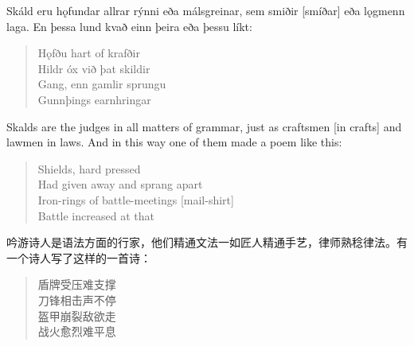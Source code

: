 \begin{paracol}{2}
    Skáld eru hǫfundar allrar rýnni eða málsgreinar, sem smiðir [smíðar] eða lǫgmenn laga. En þessa lund kvað einn þeira eða þessu líkt:
    \begin{quote}
        Hǫfðu hart of krafðir\\
        Hildr óx við þat skildir\\
        Gang, enn gamlir sprungu\\
        Gunnþings earnhringar\footnotemark[1]
    \end{quote}

    \switchcolumn
    Skalds are the judges in all matters of grammar, just as craftsmen [in crafts] and lawmen in laws. And in this way one of them made a poem like this:
    \begin{quote}
        Shields, hard pressed\\
        Had given away and sprang apart\\
        Iron-rings of battle-meetings [mail-shirt]\\
        Battle increased at that\\
    \end{quote}

\end{paracol}
\begin{translation*}{}
    吟游诗人是语法方面的行家，他们精通文法一如匠人精通手艺，律师熟稔律法。有一个诗人写了这样的一首诗：
    \begin{quote}
        盾牌受压难支撑\\
        刀锋相击声不停\\
        盔甲崩裂敌欲走\\
        战火愈烈难平息
    \end{quote}
\end{translation*}

